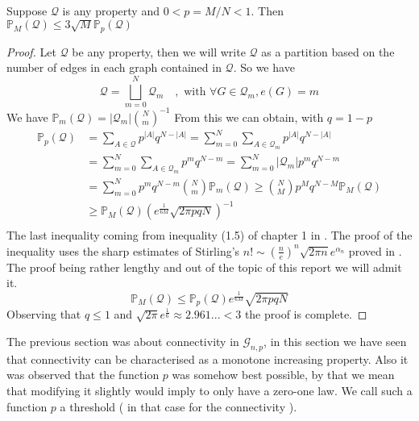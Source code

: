 \begin{theorem}\label{th:linkMP}
	Suppose $\mathcal{Q}$ is any property and $0 < p = M/N< 1$. 
	\newline
	Then $\mathbb{P}_M(\mathcal{Q}) \leq 3 \sqrt{M}\mathbb{P}_p(\mathcal{Q})$
\end{theorem}
\begin{proof}
	Let $\mathcal{Q}$ be any property, then we will write $\mathcal{Q}$ as a partition based on the number of edges in each graph contained in $\mathcal{Q}$.
	\newline
	So we have
	$$\mathcal{Q} = \bigsqcup_{m=0}^{N} \mathcal{Q}_m \quad, \text{ with } \forall G \in \mathcal{Q}_m, e(G) = m$$
	We have $\mathbb{P}_m(\mathcal{Q}) = |\mathcal{Q}_m| \binom{N}{m}^{-1}$
	From this we can obtain, with $q = 1 - p$
	\begin{align*}
		\mathbb{P}_p(\mathcal{Q})	&= \sum_{A \in \mathcal{Q}} p^{|A|}q^{N-|A|}
						= \sum_{m=0}^{N}\sum_{A \in \mathcal{Q}_m} p^{|A|}q^{N-|A|}\\
						&= \sum_{m=0}^{N}\sum_{A \in \mathcal{Q}_m} p^{m}q^{N-m}
						= \sum_{m=0}^{N}|\mathcal{Q}_m|p^{m}q^{N-m}\\
						&= \sum_{m=0}^N p^mq^{N-m}\binom{N}{m}\mathbb{P}_m(\mathcal{Q}) 
						\geq \binom{N}{M}p^Mq^{N-M}\mathbb{P}_M(\mathcal{Q}) \\
						&\geq \mathbb{P}_M(\mathcal{Q})(e^{\frac{1}{6M}}\sqrt{2\pi p q N})^{-1}\\
	\end{align*}
	The last inequality coming from inequality (1.5) of chapter 1 in \cite{Bollob01}. The proof of the inequality uses the sharp estimates of Stirling's $n! \sim (\frac{n}{e})^n\sqrt{2\pi n}e^{\alpha_n}$ proved in \cite{Robins55}. 
	The proof being rather lengthy and out of the topic of this report we will admit it.
	\begin{equation}
		\mathbb{P}_M(\mathcal{Q}) \leq  \mathbb{P}_p(\mathcal{Q})e^{\frac{1}{6M}}\sqrt{2\pi pq N}
	\end{equation}
	Observing that $q \leq 1$ and $\sqrt{2\pi}e^{\frac{1}{6}} \approx 2.961... < 3$ the proof is complete.
\end{proof}
The previous section was about connectivity in $\mathcal{G}_{n,p}$, in this section we have seen that connectivity can be characterised as a monotone increasing property.
Also it was observed that the function $p$ was somehow best possible, by that we mean that modifying it slightly would imply to only have a zero-one law. 
We call such a function $p$ a threshold ( in that case for the connectivity ). 
\newline

